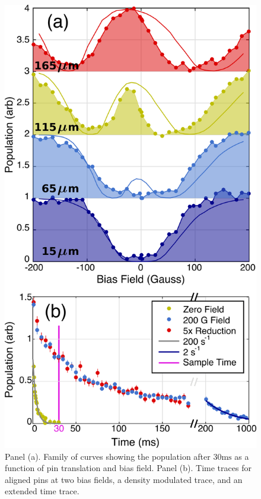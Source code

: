\documentclass[%
 reprint,
 amsmath,amssymb,
 aps,
prl,
]{revtex4-1}
\begin{document}
\begin{figure}[tb]
\includegraphics[width=\linewidth]{VWFig/tim-style-by-dave-1hz.png}%
\caption{
Panel (a). Family of curves showing the population after $30 \text{ms}$ as a function of pin translation and bias field. Panel (b). Time traces for aligned pins at two bias fields, a density modulated trace, and an extended time trace.
\label{fig:WVplot}}
\end{figure}
\end{document}
